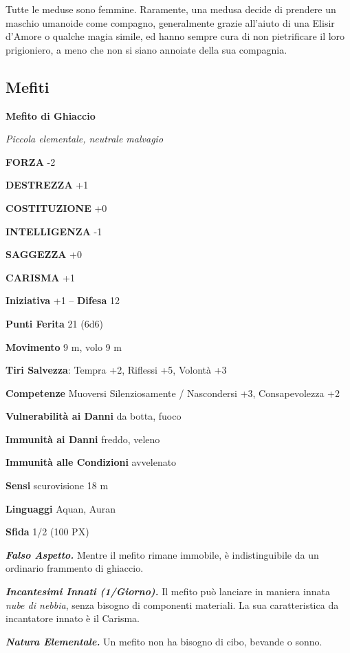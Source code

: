 \begin{multicols}{2}
	Tutte le meduse sono femmine. Raramente, una medusa decide di prendere un maschio umanoide come compagno, generalmente grazie all'aiuto di una Elisir d'Amore o qualche magia simile, ed hanno sempre cura di non pietrificare il loro prigioniero, a meno che non si siano annoiate della sua compagnia.


	\subsection{Mefiti}

	\medskip{}\textbf{Mefito di Ghiaccio}

	\textit{Piccola elementale, neutrale malvagio}

	\textbf{FORZA} -2

	\textbf{DESTREZZA} +1

	\textbf{COSTITUZIONE} +0

	\textbf{INTELLIGENZA} -1

	\textbf{SAGGEZZA} +0

	\textbf{CARISMA} +1

	\textbf{Iniziativa} +1 -- \textbf{Difesa} 12

	\textbf{Punti Ferita} 21 (6d6)

	\textbf{Movimento} 9 m, volo 9 m

	\textbf{Tiri Salvezza}: Tempra +2, Riflessi +5, Volontà +3

	\textbf{Competenze} Muoversi Silenziosamente / Nascondersi +3, Consapevolezza +2

	\textbf{Vulnerabilità ai Danni} da botta, fuoco

	\textbf{Immunità ai Danni} freddo, veleno

	\textbf{Immunità alle Condizioni} avvelenato

	\textbf{Sensi} scurovisione 18 m

	\textbf{Linguaggi} Aquan, Auran

	\textbf{Sfida} 1/2 (100 PX)

	\textit{\textbf{Falso Aspetto.}} Mentre il mefito rimane immobile, è indistinguibile da un ordinario frammento di ghiaccio.

	\textit{\textbf{Incantesimi Innati (1/Giorno).}} Il mefito può lanciare in maniera innata \textit{nube di nebbia}, senza bisogno di componenti materiali. La sua caratteristica da incantatore innato è il Carisma.

	\textit{\textbf{Natura Elementale.}} Un mefito non ha bisogno di cibo, bevande o sonno.


\end{multicols}
